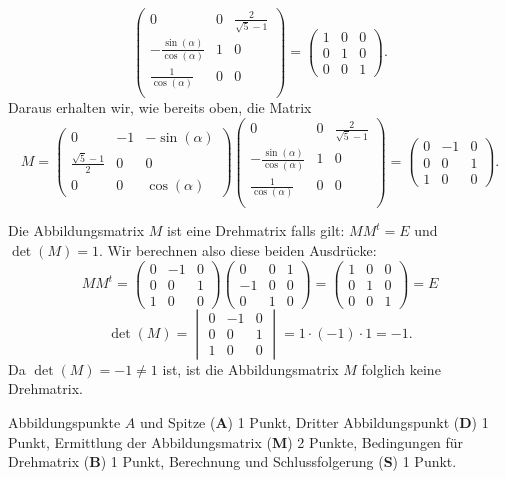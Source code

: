 \begin{loesung}
\begin{teilaufgaben}
\[\begin{pmatrix}
0&0&\frac{2}{\sqrt{5}-1}\\
-\frac{\sin(\alpha)}{\cos(\alpha)}&1&0\\
\frac{1}{\cos(\alpha)}&0&0\\
\end{pmatrix}
=
\begin{pmatrix}
1&0&0\\
0&1&0\\
0&0&1
\end{pmatrix}.
\]
Daraus erhalten wir, wie bereits oben, die Matrix 
\[
M=
\begin{pmatrix}
0                   &-1&-\sin(\alpha)\\
\frac{\sqrt{5}-1}{2}& 0&0\\
0                   & 0&\cos(\alpha)
\end{pmatrix}
\begin{pmatrix}
0&0&\frac{2}{\sqrt{5}-1}\\
-\frac{\sin(\alpha)}{\cos(\alpha)}&1&0\\
\frac{1}{\cos(\alpha)}&0&0\\
\end{pmatrix}
=
\begin{pmatrix}
0&-1&0\\
0&0&1\\
1&0&0
\end{pmatrix}.
\]
\item
Die Abbildungsmatrix $M$ ist eine Drehmatrix falls gilt: $MM^t= E $ und $\det(M) = 1$.
Wir berechnen also diese beiden Ausdrücke:
\[
MM^t = 
\begin{pmatrix}
0&-1&0\\
0&0&1\\
1&0&0
\end{pmatrix}
\begin{pmatrix}
0&0&1\\
-1&0&0\\
0 &1&0
\end{pmatrix}
=
\begin{pmatrix}
1&0&0\\
0&1&0\\
0 &0&1
\end{pmatrix} = E
\]
\[
\det(M) = 
\begin{vmatrix}
0&-1&0\\
0&0&1\\
1&0&0
\end{vmatrix}
= 
1\cdot(-1)\cdot 1 = -1.
\]
Da $\det(M) = -1 \neq 1$ ist, ist die Abbildungsmatrix $M$ folglich keine Drehmatrix.
\end{teilaufgaben}
\end{loesung}

\begin{bewertung}
Abbildungspunkte $A$ und Spitze ({\bf A}) 1 Punkt,
Dritter Abbildungspunkt ({\bf D}) 1 Punkt,
Ermittlung der Abbildungsmatrix ({\bf M}) 2 Punkte,
Bedingungen für Drehmatrix ({\bf B}) 1 Punkt,
Berechnung und Schlussfolgerung ({\bf S}) 1 Punkt.
\end{bewertung}


